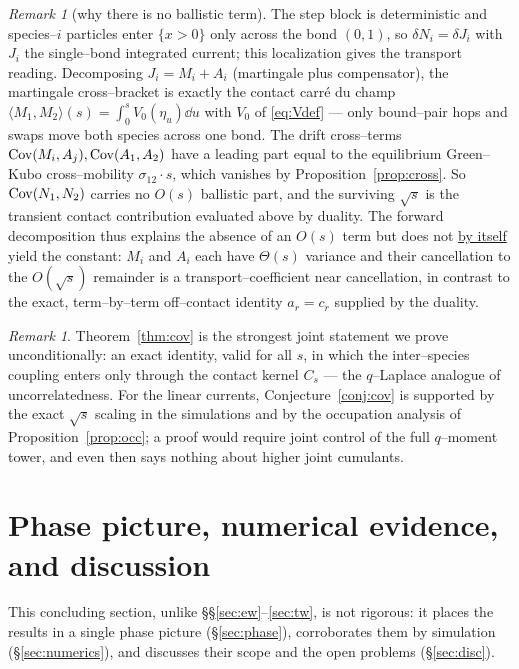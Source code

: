 \documentclass[11pt]{article}
\theoremstyle{plain}
\theoremstyle{definition}
\theoremstyle{remark}
\newtheorem{remark}[theorem]{Remark}
\begin{document}
\begin{remark}[why there is no ballistic term]\label{rem:noballistic}
The step block is deterministic and species--$i$ particles enter $\{x>0\}$ only across
the bond $(0,1)$, so $\delta N_i=\delta J_i$ with $J_i$ the single--bond integrated
current; this localization gives the transport reading. Decomposing
$J_i=M_i+A_i$ (martingale plus compensator), the martingale cross--bracket is exactly the
contact carr\'e du champ $\langle M_1,M_2\rangle(s)=\int_0^s V_0(\eta_u)\dd u$ with $V_0$
of \eqref{eq:Vdef} --- only bound--pair hops and swaps move both species across one bond.
The drift cross--terms $\operatorname{Cov}(M_i,A_j),\operatorname{Cov}(A_1,A_2)$ have a leading part equal to the
equilibrium Green--Kubo cross--mobility $\sigma_{12}\cdot s$, which vanishes by
Proposition~\ref{prop:cross}. So $\operatorname{Cov}(N_1,N_2)$ carries no $O(s)$ ballistic part, and
the surviving $\sqrt s$ is the transient contact contribution evaluated above by duality.
The forward decomposition thus explains the absence of an $O(s)$ term but does not
\underline{by itself} yield the constant: $M_i$ and $A_i$ each have $\Theta(s)$ variance and
their cancellation to the $O(\sqrt s)$ remainder is a transport--coefficient near
cancellation, in contrast to the exact, term--by--term off--contact identity
$a_r=c_r$ supplied by the duality.
\end{remark}

\begin{remark}\label{rem:uncorr}
Theorem~\ref{thm:cov} is the strongest joint statement we prove unconditionally: an
exact identity, valid for all $s$, in which the inter--species coupling enters only
through the contact kernel $C_s$ --- the $q$--Laplace analogue of uncorrelatedness.
For the linear currents, Conjecture~\ref{conj:cov} is supported by the exact
$\sqrt s$ scaling in the simulations and by the occupation analysis of
Proposition~\ref{prop:occ}; a proof would require joint control of the full
$q$--moment tower, and even then says nothing about higher joint cumulants.
\end{remark}

\section{Phase picture, numerical evidence, and discussion}\label{sec:summary}

This concluding section, unlike \S\S\ref{sec:ew}--\ref{sec:tw}, is not rigorous: it
places the results in a single phase picture (\S\ref{sec:phase}), corroborates them by
simulation (\S\ref{sec:numerics}), and discusses their scope and the open problems
(\S\ref{sec:disc}).
\end{document}
